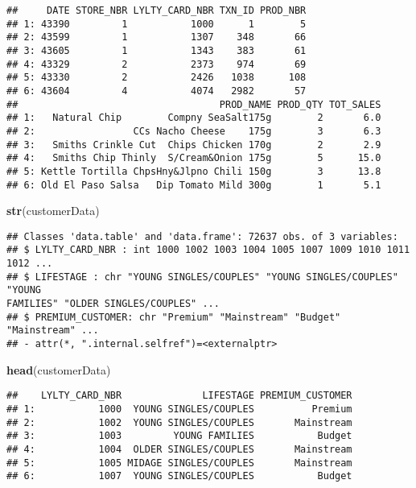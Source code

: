 \documentclass[
]{article}
\newenvironment{Shaded}{\begin{snugshade}}{\end{snugshade}}
\newcommand{\FunctionTok}[1]{\textcolor[rgb]{0.13,0.29,0.53}{\textbf{#1}}}
\newcommand{\NormalTok}[1]{#1}
\begin{document}
\begin{verbatim}
##     DATE STORE_NBR LYLTY_CARD_NBR TXN_ID PROD_NBR
## 1: 43390         1           1000      1        5
## 2: 43599         1           1307    348       66
## 3: 43605         1           1343    383       61
## 4: 43329         2           2373    974       69
## 5: 43330         2           2426   1038      108
## 6: 43604         4           4074   2982       57
##                                   PROD_NAME PROD_QTY TOT_SALES
## 1:   Natural Chip        Compny SeaSalt175g        2       6.0
## 2:                 CCs Nacho Cheese    175g        3       6.3
## 3:   Smiths Crinkle Cut  Chips Chicken 170g        2       2.9
## 4:   Smiths Chip Thinly  S/Cream&Onion 175g        5      15.0
## 5: Kettle Tortilla ChpsHny&Jlpno Chili 150g        3      13.8
## 6: Old El Paso Salsa   Dip Tomato Mild 300g        1       5.1
\end{verbatim}

\begin{Shaded}
\begin{Highlighting}[]
\FunctionTok{str}\NormalTok{(customerData)}
\end{Highlighting}
\end{Shaded}

\begin{verbatim}
## Classes 'data.table' and 'data.frame': 72637 obs. of 3 variables:
## $ LYLTY_CARD_NBR : int 1000 1002 1003 1004 1005 1007 1009 1010 1011 1012 ...
## $ LIFESTAGE : chr "YOUNG SINGLES/COUPLES" "YOUNG SINGLES/COUPLES" "YOUNG
FAMILIES" "OLDER SINGLES/COUPLES" ...
## $ PREMIUM_CUSTOMER: chr "Premium" "Mainstream" "Budget" "Mainstream" ...
## - attr(*, ".internal.selfref")=<externalptr>
\end{verbatim}

\begin{Shaded}
\begin{Highlighting}[]
\FunctionTok{head}\NormalTok{(customerData)}
\end{Highlighting}
\end{Shaded}

\begin{verbatim}
##    LYLTY_CARD_NBR              LIFESTAGE PREMIUM_CUSTOMER
## 1:           1000  YOUNG SINGLES/COUPLES          Premium
## 2:           1002  YOUNG SINGLES/COUPLES       Mainstream
## 3:           1003         YOUNG FAMILIES           Budget
## 4:           1004  OLDER SINGLES/COUPLES       Mainstream
## 5:           1005 MIDAGE SINGLES/COUPLES       Mainstream
## 6:           1007  YOUNG SINGLES/COUPLES           Budget
\end{verbatim}
\end{document}

